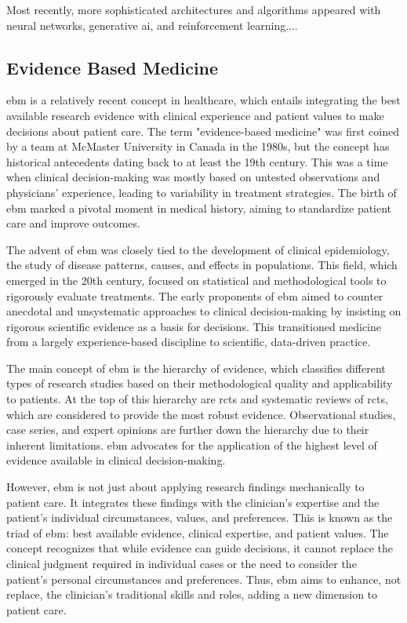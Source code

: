 Most recently, more sophisticated architectures and algorithms appeared with neural networks, generative \ac{ai}, and reinforcement learning....





\subsection{Evidence Based Medicine}
\ac{ebm} is a relatively recent concept in healthcare, which entails integrating the best available research evidence with clinical experience and patient values to make decisions about patient care. The term "evidence-based medicine" was first coined by a team at McMaster University in Canada in the 1980s, but the concept has historical antecedents dating back to at least the 19th century. This was a time when clinical decision-making was mostly based on untested observations and physicians' experience, leading to variability in treatment strategies. The birth of \ac{ebm} marked a pivotal moment in medical history, aiming to standardize patient care and improve outcomes.

The advent of \ac{ebm} was closely tied to the development of clinical epidemiology, the study of disease patterns, causes, and effects in populations. This field, which emerged in the 20th century, focused on statistical and methodological tools to rigorously evaluate treatments. The early proponents of \ac{ebm} aimed to counter anecdotal and unsystematic approaches to clinical decision-making by insisting on rigorous scientific evidence as a basis for decisions. This transitioned medicine from a largely experience-based discipline to scientific, data-driven practice.

The main concept of \ac{ebm} is the hierarchy of evidence, which classifies different types of research studies based on their methodological quality and applicability to patients. At the top of this hierarchy are \acp{rct} and systematic reviews of \acp{rct}, which are considered to provide the most robust evidence. Observational studies, case series, and expert opinions are further down the hierarchy due to their inherent limitations. \ac{ebm} advocates for the application of the highest level of evidence available in clinical decision-making.

However, \ac{ebm} is not just about applying research findings mechanically to patient care. It integrates these findings with the clinician's expertise and the patient's individual circumstances, values, and preferences. This is known as the triad of \ac{ebm}: best available evidence, clinical expertise, and patient values. The concept recognizes that while evidence can guide decisions, it cannot replace the clinical judgment required in individual cases or the need to consider the patient's personal circumstances and preferences. Thus, \ac{ebm} aims to enhance, not replace, the clinician's traditional skills and roles, adding a new dimension to patient care.


